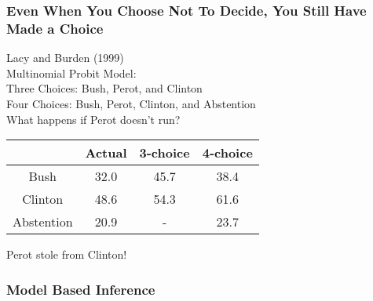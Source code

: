 \documentclass{beamer}
\begin{document}
\begin{frame}
\frametitle{Even When You Choose Not To Decide, You Still Have Made a Choice}

Lacy and Burden (1999)\\
Multinomial Probit Model:\\
Three Choices: Bush, Perot, and Clinton\\
Four Choices: Bush, Perot, Clinton, and Abstention\\
What happens if Perot doesn't run?

\begin{tabular}{cccc}
\hline
		& Actual & 3-choice & 4-choice \\
\hline
Bush    & 32.0   & 45.7     & 38.4     \\
Clinton & 48.6   & 54.3     & 61.6     \\
Abstention & 20.9 & -       & 23.7    \\
\hline
\end{tabular}


Perot stole from Clinton!

\end{frame}

\begin{frame}

\frametitle{Model Based Inference}


\end{frame}
\end{document}
